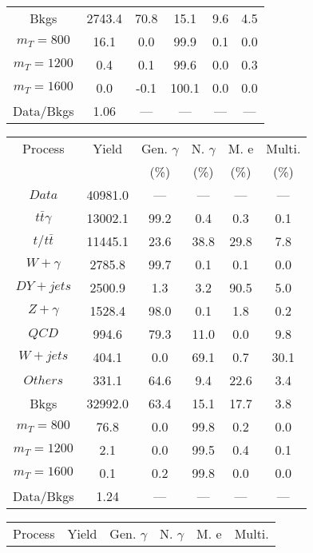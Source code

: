 \begin{figure}
\begin{minipage}[c]{0.32\textwidth}
{\begin{tabular}{cccccc}
Bkgs &  2743.4 &  70.8 &  15.1 &  9.6 &  4.5\\
$ m_{T} = 800 $ &  16.1 &  0.0 &  99.9 &  0.1 &  0.0\\
$ m_{T} = 1200 $ &  0.4 &  0.1 &  99.6 &  0.0 &  0.3\\
$ m_{T} = 1600 $ &  0.0 &  -0.1 &  100.1 &  0.0 &  0.0\\
Data/Bkgs &  1.06 &  --- &  --- &  --- &  ---\\
\hline
\end{tabular}
}
\end{minipage}
\begin{minipage}[c]{0.32\textwidth}
\centering
\tiny{
\begin{tabular}{cccccc}
\hline
Process & Yield & Gen. $\gamma$ & N. $\gamma$ & M. e & Multi. \\
 &  & (\%) & (\%) & (\%) & (\%)  \\
\hline
                                                                      $ Data $ &  40981.0 &  --- &  --- &  --- &  ---\\
$ t\bar{t}\gamma $ &  13002.1 &  99.2 &  0.4 &  0.3 &  0.1\\
$ t/t\bar{t} $ &  11445.1 &  23.6 &  38.8 &  29.8 &  7.8\\
$ W+\gamma $ &  2785.8 &  99.7 &  0.1 &  0.1 &  0.0\\
$ DY+jets $ &  2500.9 &  1.3 &  3.2 &  90.5 &  5.0\\
$ Z+\gamma $ &  1528.4 &  98.0 &  0.1 &  1.8 &  0.2\\
$ QCD $ &  994.6 &  79.3 &  11.0 &  0.0 &  9.8\\
$ W+jets $ &  404.1 &  0.0 &  69.1 &  0.7 &  30.1\\
$ Others $ &  331.1 &  64.6 &  9.4 &  22.6 &  3.4\\
Bkgs &  32992.0 &  63.4 &  15.1 &  17.7 &  3.8\\
$ m_{T} = 800 $ &  76.8 &  0.0 &  99.8 &  0.2 &  0.0\\
$ m_{T} = 1200 $ &  2.1 &  0.0 &  99.5 &  0.4 &  0.1\\
$ m_{T} = 1600 $ &  0.1 &  0.2 &  99.8 &  0.0 &  0.0\\
Data/Bkgs &  1.24 &  --- &  --- &  --- &  ---\\
\hline
\end{tabular}
}
\end{minipage}
\begin{minipage}[c]{0.32\textwidth}
\centering
\tiny{
\begin{tabular}{cccccc}
\hline
Process & Yield & Gen. $\gamma$ & N. $\gamma$ & M. e & Multi. \\

\end{tabular}}
\end{minipage}
\end{figure}

